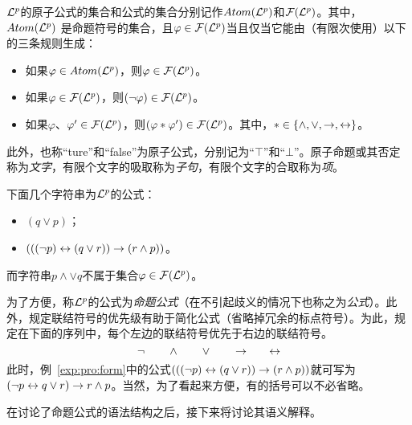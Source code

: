 ${\cal L}^p$的原子公式的集合和公式的集合分别记作$Atom({\cal L}^p)$和${\cal F}({\cal L}^p)$。其中，$Atom({\cal L}^p)$ 是命题符号的集合，且$\varphi\in {\cal F}({\cal L}^p)$当且仅当它能由（有限次使用）以下的三条规则生成\cite{luzhongwan1989}：
\begin{itemize}
	\item 如果$\varphi\in Atom({\cal L}^p)$，则$\varphi \in {\cal F}({\cal L}^p)$。
	\item 如果$\varphi \in {\cal F}({\cal L}^p)$，则$(\neg \varphi)\in {\cal F}({\cal L}^p)$。
	\item 如果$\varphi$、$\varphi'\in {\cal F}({\cal L}^p)$，则$(\varphi * \varphi')\in {\cal F}({\cal L}^p)$。其中，$*\in \{\wedge,\vee, \rightarrow, \leftrightarrow\}$。
\end{itemize}
此外，也称“ture”和“false”为原子公式，分别记为“$\top$”和“$\bot$”。原子命题或其否定称为\emph{文字}，有限个文字的吸取称为\emph{子句}，有限个文字的合取称为\emph{项}。

\begin{example}\label{exp:pro:form}
	下面几个字符串为${\cal L}^p$的公式：
	\begin{itemize}
		\item $(q \vee p)$；
		\item $(((\neg p)\leftrightarrow(q\vee r))\rightarrow(r \wedge p))$。
	\end{itemize}
	而字符串$p\wedge \vee q$不属于集合$\varphi\in {\cal F}({\cal L}^p)$。
\end{example}


为了方便，称${\cal L}^p$的公式为\emph{命题公式}（在不引起歧义的情况下也称之为\emph{公式}）。此外，规定联结符号的优先级有助于简化公式（省略掉冗余的标点符号）。为此，规定在下面的序列中，每个左边的联结符号优先于右边的联结符号。
\[
\neg \qquad \wedge \qquad \vee \qquad \rightarrow \qquad \leftrightarrow
\]
此时，例~\ref{exp:pro:form}中的公式$(((\neg p)\leftrightarrow(q\vee r))\rightarrow(r \wedge p))$就可写为$(\neg p \leftrightarrow q \vee r) \rightarrow r \wedge p$。当然，为了看起来方便，有的括号可以不必省略。

在讨论了命题公式的语法结构之后，接下来将讨论其语义解释。

